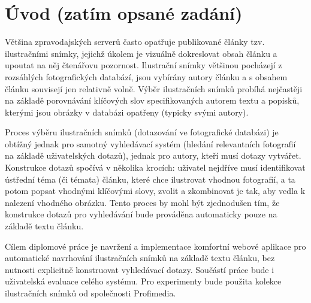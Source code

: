 \chapter*{Úvod (zatím opsané zadání)}

Většina zpravodajských serverů často opatřuje publikované články tzv. ilustračními snímky, jejichž úkolem je vizuálně dokreslovat obsah článku a upoutat na něj čtenářovu pozornost. Ilustrační snímky většinou pocházejí z rozsáhlých fotografických databází, jsou vybírány autory článku a s obsahem článku souvisejí jen relativně volně. Výběr ilustračních snímků probíhá nejčastěji na základě porovnávání klíčových slov specifikovaných autorem textu a popisků, kterými jsou obrázky v databázi opatřeny (typicky svými autory). 

Proces výběru ilustračních snímků (dotazování ve fotografické databázi) je obtížný jednak pro samotný vyhledávací systém (hledání relevantních fotografií na základě uživatelských dotazů), jednak pro autory, kteří musí dotazy vytvářet. Konstrukce dotazů spočívá v několika krocích: uživatel nejdříve musí identifikovat ústřední téma (či témata) článku, které chce ilustrovat vhodnou fotografií, a ta potom popsat vhodnými klíčovými slovy, zvolit a zkombinovat je tak, aby vedla k nalezení vhodného obrázku. Tento proces by mohl být zjednodušen tím, že konstrukce dotazů pro vyhledávání bude prováděna automaticky pouze na základě textu článku. 

Cílem diplomové práce je navržení a implementace komfortní webové aplikace pro automatické navrhování ilustračních snímků na základě textu článku, bez nutnosti explicitně konstruovat vyhledávací dotazy. Součástí práce bude i uživatelská evaluace celého systému. Pro experimenty bude použita kolekce ilustračních snímků od společnosti Profimedia.


